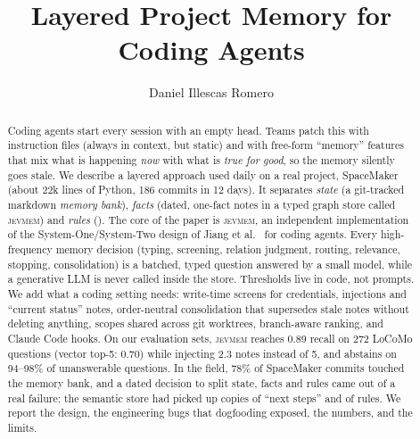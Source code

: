 \documentclass[sigconf,nonacm]{acmart}
\newcommand{\code}[1]{\texttt{\detokenize{#1}}}
\newcommand{\jevmem}{\textsc{jevmem}}
\begin{document}
\title{Layered Project Memory for Coding Agents}

\author{Daniel Illescas Romero}

\begin{abstract}
Coding agents start every session with an empty head. Teams patch this with instruction files (always in context, but static) and with free-form ``memory'' features that mix what is happening \emph{now} with what is \emph{true for good}, so the memory silently goes stale. We describe a layered approach used daily on a real project, SpaceMaker (about 22k lines of Python, 186 commits in 12 days). It separates \emph{state} (a git-tracked markdown \emph{memory bank}), \emph{facts} (dated, one-fact notes in a typed graph store called \jevmem) and \emph{rules} (\code{AGENTS.md}). The core of the paper is \jevmem, an independent implementation of the System-One/System-Two design of Jiang et al.~\cite{jiang2026jevmem} for coding agents. Every high-frequency memory decision (typing, screening, relation judgment, routing, relevance, stopping, consolidation) is a batched, typed question answered by a small model, while a generative LLM is never called inside the store. Thresholds live in code, not prompts. We add what a coding setting needs: write-time screens for credentials, injections and ``current status'' notes, order-neutral consolidation that supersedes stale notes without deleting anything, scopes shared across git worktrees, branch-aware ranking, and Claude Code hooks. On our evaluation sets, \jevmem{} reaches 0.89 recall on 272 LoCoMo questions (vector top-5: 0.70) while injecting 2.3 notes instead of 5, and abstains on 94--98\% of unanswerable questions. In the field, 78\% of SpaceMaker commits touched the memory bank, and a dated decision to split state, facts and rules came out of a real failure: the semantic store had picked up copies of ``next steps'' and of rules. We report the design, the engineering bugs that dogfooding exposed, the numbers, and the limits.
\end{abstract}


\maketitle















\appendix

\end{document}
